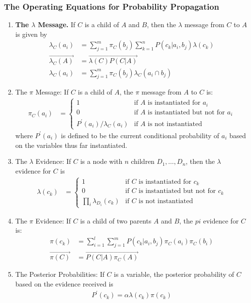 \documentclass[12pt,twoside]{article}
\begin{document}
\subsubsection{The Operating Equations for Probability Propagation}
	\begin{enumerate}
		\item \textbf{The $\lambda$ Message.} If $C$ is a child of $A$ and $B$, then the $\lambda$ message from $C$ to $A$ is given by
			\begin{align*}
				\lambda_C(a_i)& = \sum_{j=1}^m \pi_C(b_j) \sum_{k=1}^n P(c_k \vert a_i, b_j)\lambda(c_k)\\
				\vec{\lambda_C(A)}&=\vec{\lambda(C)P(C\vert A)}\\
				\lambda_C(a_i)& = \sum_{j=1}^m \pi_C(b_j) \lambda_C(a_i \cap b_j)
			\end{align*}


		\item {The $\pi$ Message:} If $C$ is a child of $A$, the $\pi$ message from $A$ to $C$ is:
			\begin{align*}
				\pi_C(a_i) & = \begin{cases}
						1 													& \text{if $A$ is instantiated for $a_i$} \\
						0 													& \text{if $A$ is instantiated but not for $a_i$} \\
						P^\prime(a_i)/\lambda_C(a_i)		 	& \text{if $A$ is not instantiated}
				\end{cases}
			\end{align*}
		where $P^\prime(a_i)$ is defined to be the current conditional probability of $a_i$ based on the variables thus far instantiated.

		\item {The $\lambda$ Evidence:} If $C$ is a node with $n$ children $D_1, \dots, D_n$, then the $\lambda$ evidence for $C$ is
			\begin{align*}
				\lambda(c_k) &=\begin{cases}
						1											& \text{if $C$ is instantiated for $c_k$}\\
						0											& \text{if $C$ is instantiated but not for $c_k$}\\
						\prod_i \lambda_{D_i}(c_k)	& \text{if $C$ is not instantiated}
				\end{cases}
			\end{align*}

		\item {The $\pi$ Evidence:} If $C$ is a child of two parents $A$ and $B$, the $pi$ evidence for $C$ is:
			\begin{align*}
				\pi(c_k)& = \sum_{i=1}^l \sum_{j=1}^m P(c_k \vert a_i, b_j)\pi_C(a_i)\pi_C(b_i)\\
				\vec{\pi(C)}& = \vec{P(C\vert A)\pi_C(A)}
			\end{align*}

		\item {The Posterior Probabilities:} If $C$ is a variable, the posterior probability of $C$ based on the evidence received is
			\begin{align*}
				P^\prime(c_k) = \alpha \lambda(c_k) \pi(c_k)
			\end{align*}
\end{enumerate}
\end{document}
